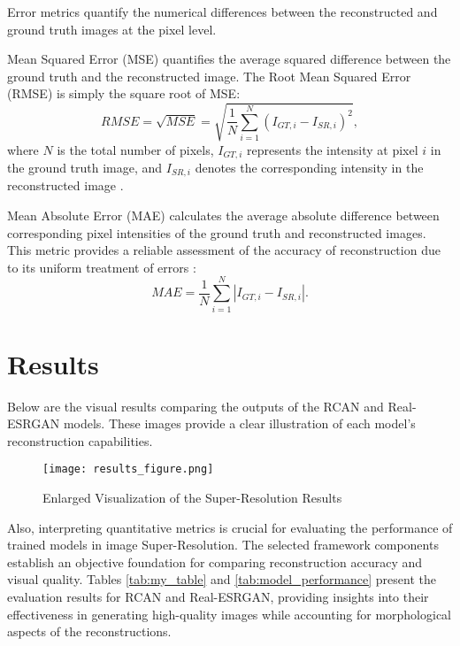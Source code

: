 \documentclass[10pt,twocolumn]{article}
\begin{document}
Error metrics quantify the numerical differences between the reconstructed and ground truth images at the pixel level.

Mean Squared Error (MSE) quantifies the average squared difference between the ground truth and the reconstructed image. The Root Mean Squared Error (RMSE) is simply the square root of MSE:
\begin{equation}
RMSE = \sqrt{MSE} = \sqrt{\frac{1}{N} \sum_{i=1}^{N} \left( I_{GT,i} - I_{SR,i} \right)^2},
\end{equation}
where \( N \) is the total number of pixels, \( I_{GT,i} \) represents the intensity at pixel \( i \) in the ground truth image, and \( I_{SR,i} \) denotes the corresponding intensity in the reconstructed image \cite{Chai2014}.

Mean Absolute Error (MAE) calculates the average absolute difference between corresponding pixel intensities of the ground truth and reconstructed images. This metric provides a reliable assessment of the accuracy of reconstruction due to its uniform treatment of errors \cite{Chai2014}:
\begin{equation}
MAE = \frac{1}{N} \sum_{i=1}^{N} \left| I_{GT,i} - I_{SR,i} \right|.
\end{equation}

\section{Results}
Below are the visual results comparing the outputs of the RCAN and Real-ESRGAN models. These images provide a clear illustration of each model's reconstruction capabilities.

\begin{figure}[ht]
    \centering
    \vspace{-0.3cm}
    \texttt{[image: results\_figure.png]}
    \vspace{-0.8cm}
    \caption{\centering Enlarged Visualization of the  Super-Resolution Results }
    \label{results}
\end{figure}

Also, interpreting quantitative metrics is crucial for evaluating the performance of trained models in image Super-Resolution. The selected framework components establish an objective foundation for comparing reconstruction accuracy and visual quality. Tables \ref{tab:my_table} and \ref{tab:model_performance} present the evaluation results for RCAN and Real-ESRGAN, providing insights into their effectiveness in generating high-quality images while accounting for morphological aspects of the reconstructions.
\end{document}
